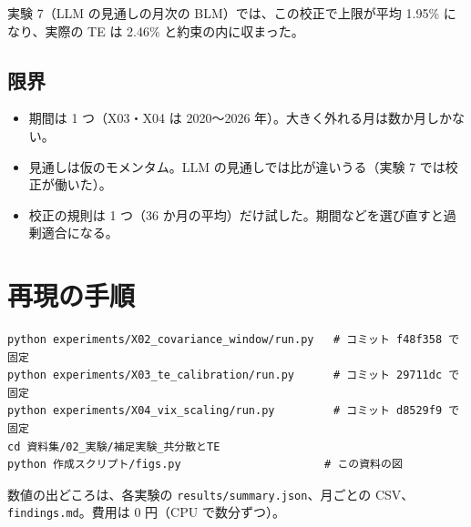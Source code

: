 \documentclass[xelatex,ja=standard,jafont=haranoaji,a4paper,10pt,openany]{bxjsreport}
\newcommand{\code}[1]{\texttt{#1}}
\begin{document}
実験 7（LLM の見通しの月次の BLM）では、この校正で上限が平均 1.95\% になり、実際の TE は 2.46\% と約束の内に収まった。

\section{限界}

\begin{itemize}
\item 期間は 1 つ（X03・X04 は 2020〜2026 年）。大きく外れる月は数か月しかない。
\item 見通しは仮のモメンタム。LLM の見通しでは比が違いうる（実験 7 では校正が働いた）。
\item 校正の規則は 1 つ（36 か月の平均）だけ試した。期間などを選び直すと過剰適合になる。
\end{itemize}

\chapter*{再現の手順}

\begin{verbatim}
python experiments/X02_covariance_window/run.py   # コミット f48f358 で固定
python experiments/X03_te_calibration/run.py      # コミット 29711dc で固定
python experiments/X04_vix_scaling/run.py         # コミット d8529f9 で固定
cd 資料集/02_実験/補足実験_共分散とTE
python 作成スクリプト/figs.py                      # この資料の図
\end{verbatim}

数値の出どころは、各実験の \code{results/summary.json}、月ごとの CSV、\code{findings.md}。費用は 0 円（CPU で数分ずつ）。
\end{document}
